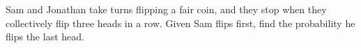 Sam and Jonathan take turns flipping a fair coin, and they stop when they collectively flip three heads in a row. Given Sam flips first, find the probability he flips the last head.
